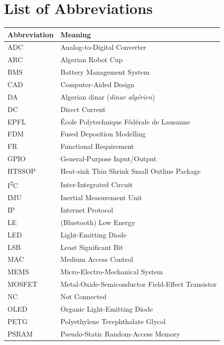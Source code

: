 \chapter*{List of Abbreviations}

\renewcommand{\arraystretch}{1.1}
\begin{longtable}{L{3.2cm}L{\dimexpr\textwidth-4.4cm\relax}}
\toprule
\textbf{Abbreviation} & \textbf{Meaning} \\
\midrule
\endhead
ADC    & Analog-to-Digital Converter \\
ARC    & Algerian Robot Cup \\
BMS    & Battery Management System \\
CAD    & Computer-Aided Design \\
DA     & Algerian dinar (\emph{dinar algérien}) \\
DC     & Direct Current \\
EPFL   & École Polytechnique Fédérale de Lausanne \\
FDM    & Fused Deposition Modelling \\
FR     & Functional Requirement \\
GPIO   & General-Purpose Input/Output \\
HTSSOP & Heat-sink Thin Shrink Small Outline Package \\
I\textsuperscript{2}C & Inter-Integrated Circuit \\
IMU    & Inertial Measurement Unit \\
IP     & Internet Protocol \\
LE     & (Bluetooth) Low Energy \\
LED    & Light-Emitting Diode \\
LSB    & Least Significant Bit \\
MAC    & Medium Access Control \\
MEMS   & Micro-Electro-Mechanical System \\
MOSFET & Metal-Oxide-Semiconductor Field-Effect Transistor \\
NC     & Not Connected \\
OLED   & Organic Light-Emitting Diode \\
PETG   & Polyethylene Terephthalate Glycol \\
PSRAM  & Pseudo-Static Random-Access Memory \\

\end{longtable}
